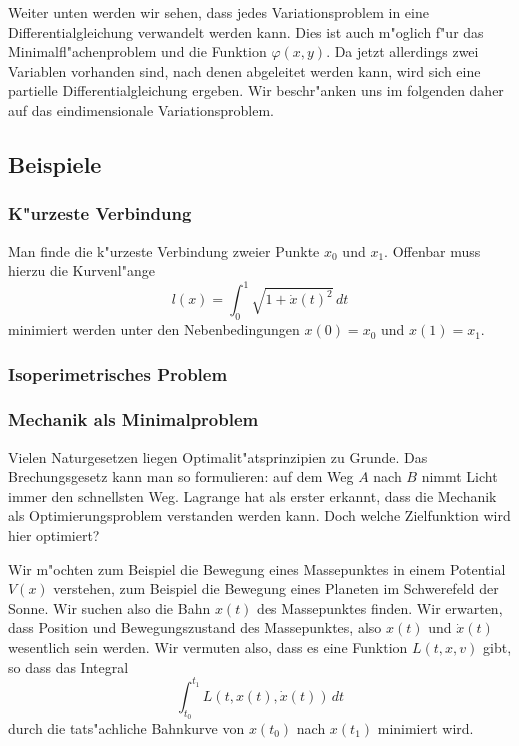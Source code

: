 Weiter unten werden wir sehen, dass jedes Variationsproblem in eine
Differentialgleichung verwandelt werden kann.
Dies ist auch m"oglich f"ur das Minimalfl"achenproblem und die 
Funktion $\varphi(x,y)$.
Da jetzt allerdings
zwei Variablen vorhanden sind, nach denen abgeleitet werden kann, wird
sich eine partielle Differentialgleichung ergeben.
Wir beschr"anken uns im folgenden daher auf das eindimensionale
Variationsproblem.

\subsection{Beispiele}
\subsubsection{K"urzeste Verbindung}
Man finde die k"urzeste Verbindung zweier Punkte $x_0$ und $x_1$.
Offenbar muss hierzu die Kurvenl"ange
\begin{equation}
l(x)=\int_0^1 \sqrt{1+\dot x(t)^2}\,dt
\label{kuerzeste-verbindung-variationsprinzip}
\end{equation}
minimiert werden unter den Nebenbedingungen $x(0)=x_0$ und
$x(1)=x_1$.

\subsubsection{Isoperimetrisches Problem}
\subsubsection{Mechanik als Minimalproblem}
Vielen Naturgesetzen liegen Optimalit"atsprinzipien zu Grunde.
Das Brechungsgesetz kann man so formulieren: auf dem Weg $A$ 
nach $B$ nimmt Licht immer den schnellsten Weg.
Lagrange hat als erster erkannt, dass die Mechanik als Optimierungsproblem
verstanden werden kann. Doch welche Zielfunktion wird hier optimiert?

Wir m"ochten zum Beispiel die Bewegung eines Massepunktes in einem
Potential $V(x)$ verstehen, zum Beispiel die Bewegung eines Planeten
im Schwerefeld der Sonne.
Wir suchen also die Bahn $x(t)$ des Massepunktes finden. 
Wir erwarten, dass Position und Bewegungszustand des Massepunktes,
also $x(t)$ und $\dot x(t)$ wesentlich sein werden.
Wir vermuten also, dass es eine Funktion $L(t,x,v)$ gibt,
so dass das Integral
\begin{equation}
\int_{t_0}^{t_1} L(t, x(t), \dot x(t))\,dt
\label{lagrange-integral}
\end{equation}
durch die tats"achliche Bahnkurve von $x(t_0)$ nach $x(t_1)$
minimiert wird.

